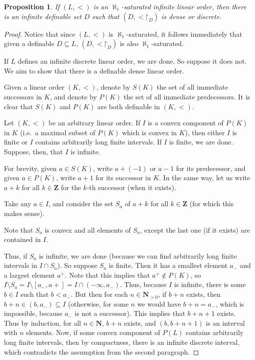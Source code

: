 \documentclass[final,a4paper,12pt]{amsart}
\newcommand{\bN}{{\mathbf{N}}}
\newcommand{\bZ}{{\mathbf{Z}}}
\newcommand{\restr}{\mathord{\upharpoonright}}
\newtheorem{prop}[thm]{Proposition}
\theoremstyle{remark}
\theoremstyle{definition}
\newcounter{claimcounter}[thm]
\newenvironment{clm}{\stepcounter{claimcounter}{\noindent {\textbf{Claim}} \theclaimcounter:}}{}
\newenvironment{clmproof}[1][\proofname]{\proof[#1]\renewcommand{\qedsymbol}{$\square$(claim)}}{\endproof}
\begin{document}
	\begin{prop}
		If $(L,<)$ is an $\aleph_1$-saturated infinite linear order, then there is an infinite definable set $D$ such that $(D,{<}\restr_D)$ is dense or discrete.
	\end{prop}
	\begin{proof}
		Notice that since $(L,<)$ is $\aleph_1$-saturated, it follows immediately that given a definable $D\subseteq L$, $(D,{<}\restr_{D})$ is also $\aleph_1$-saturated.
		
		If $L$ defines an infinite discrete linear order, we are done. So suppose it does not. We aim to show that there is a definable dense linear order.
		
		Given a linear order $(K,<)$, denote by $S(K)$ the set of all immediate successors in $K$, and denote by $P(K)$ the set of all immediate predecessors. It is clear that $S(K)$ and $P(K)$ are both definable in $(K,<)$.
		
		
		\begin{clm}
			Let $(K,<)$ be an arbitrary linear order. If $I$ is a convex component of $P(K)$ in $K$ (i.e.\ a maximal subset of $P(K)$ which is convex in $K$), then either $I$ is finite or $I$ contains arbitrarily long finite intervals.
		\end{clm}
		\begin{clmproof}
			If $I$ is finite, we are done. Suppose, then, that $I$ is infinite.
			
			For brevity, given $a\in S(K)$, write $a+(-1)$ or $a-1$ for its predecessor, and given $a\in P(K)$, write $a+1$ for its successor in $K$. In the same way, let us write $a+k$ for all $k\in \bZ$ for the $k$-th successor (when it exists).
			
			Take any $a\in I$, and consider the set $S_a$ of $a+k$ for all $k\in \bZ$ (for which this makes sense).
			
			Note that $S_a$ is convex and all elements of $S_a$, except the last one (if it exists) are contained in $I$.
			
			Thus, if $S_a$ is infinite, we are done (because we can find arbitrarily long finite intervals in $I\cap S_a$). So suppose $S_a$ is finite. Then it has a smallest element $a_-$ and a largest element $a^+$. Note that this implies that $a^+\notin P(K)$, so $I\setminus S_a=I\setminus [a_-,a+]=I\cap (-\infty,a_-)$. Thus, because $I$ is infinite, there is some $b\in I$ such that $b<a_-$. But then for each $n\in \bN_{>0}$, if $b+n$ exists, then $b+n\in (b,a_-)\subseteq I$ (otherwise, for some $n$ we would have $b+n=a_-$, which is impossible, because $a_-$ is not a successor). This implies that $b+n+1$ exists. Thus by induction, for all $n\in \bN$, $b+n$ exists, and $(b,b+n+1)$ is an interval with $n$ elements.
		\end{clmproof}
		Now, if some convex component of $P(L)$ contains arbitrarily long finite intervals, then by compactness, there is an infinite discrete interval, which contradicts the assumption from the second paragraph.
		

\end{proof}
\end{document}
